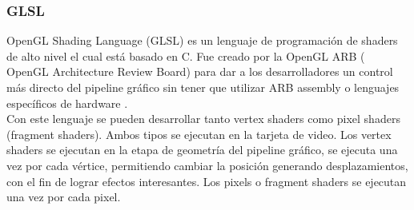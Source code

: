\documentclass[12pt]{article}
\begin{document}
\subsubsection{GLSL}
OpenGL Shading Language (GLSL) es un lenguaje de programación de shaders de alto nivel el cual está basado en C. Fue creado por la OpenGL ARB ( OpenGL Architecture Review Board) para dar a los desarrolladores un control más directo del pipeline gráfico sin tener que utilizar ARB assembly o lenguajes específicos de hardware .
\\Con este lenguaje se pueden desarrollar tanto vertex shaders como pixel shaders (fragment shaders). Ambos tipos se ejecutan en la tarjeta de video. Los vertex shaders se ejecutan en la etapa de geometría del pipeline gráfico, se ejecuta una vez por cada vértice, permitiendo cambiar la posición generando desplazamientos, con el fin de lograr efectos interesantes. Los pixels o fragment shaders se ejecutan una vez por cada pixel.

\clearpage
\end{document}

